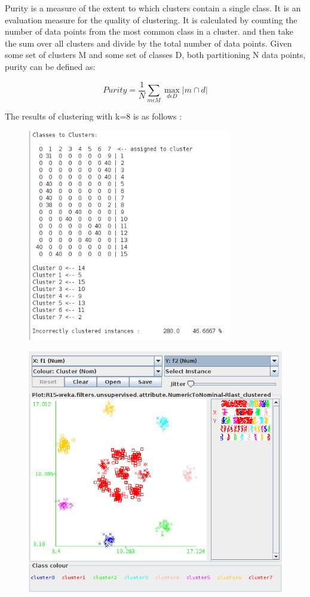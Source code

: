 \documentclass[paper=a4, fontsize=11pt]{scrartcl}
\numberwithin{equation}{section}		%
\numberwithin{figure}{section}			%
\numberwithin{table}{section}				%
\begin{document}
 Purity is a measure of the extent to which clusters contain a single class. It is an evaluation measure for the quality of clustering. It is calculated by counting the number of data points from the most common class in a cluster. and then take the sum over all clusters and divide by the total number of data points. Given some set of clusters M and some set of classes D, both partitioning N data points, purity can be defined as:
 
$$Purity = \frac{1}{N} \sum_{m \epsilon M}\max_{d \epsilon D}|m \cap d|$$

The results of clustering with k=8 is as follows :
\begin{figure}[H]
  \centering
  \includegraphics[width=0.8\textwidth]{k-means_8_2}\label{fig:f1}
\end{figure}

\begin{figure}[H]
	\centering
  \includegraphics[width=1\textwidth]{k-means_8}\label{fig:f2}
\end{figure}
\end{document}
